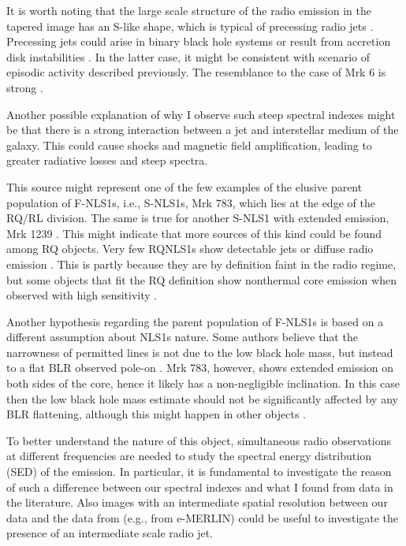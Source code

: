 \documentclass[../thesis.tex]{subfiles}
\begin{document}
It is worth noting that the large scale structure of the radio emission in the tapered image has an S-like shape, which is typical of precessing radio jets \citep{Ekers78,Parma85}.
Precessing jets could arise in binary black hole systems \citep[e.g.,][]{Roos93,Romero00,Rubinur17} or result from accretion disk instabilities \citep{Pringle96,Livio97}.
In the latter case, it might be consistent with scenario of episodic activity described previously. 
The resemblance to the case of Mrk 6 is strong \citep{Kharb06}.  

Another possible explanation of why I observe such steep spectral indexes might be that there is a strong interaction between a jet and interstellar medium of the galaxy.
This could cause shocks and magnetic field amplification, leading to greater radiative losses and steep spectra.

This source might represent one of the few examples of the elusive parent population of F-NLS1s, i.e., S-NLS1s, 
Mrk 783, which lies at the edge of the RQ/RL division.
The same is true for another S-NLS1 with extended emission, Mrk 1239 \citep{Doi15}.
This might indicate that more sources of this kind could be found among RQ objects. 
Very few RQNLS1s show detectable jets or diffuse radio emission \citep{Berton16b}.
This is partly because they are by definition faint in the radio regime, but some objects that fit the RQ definition show nonthermal core emission when observed with high sensitivity \citep{Giroletti09}.

Another hypothesis regarding the parent population of F-NLS1s is based on a different assumption about NLS1s nature. 
Some authors believe that the narrowness of permitted lines is not due to the low black hole mass, but instead to a flat BLR observed pole-on \citep[e.g.,][]{Decarli08}. 
Mrk 783, however, shows extended emission on both sides of the core, hence it likely has a non-negligible inclination. 
In this case then the low black hole mass estimate should not be significantly affected by any BLR flattening, although this might happen in other objects \citep{Shen14}. 

To better understand the nature of this object, simultaneous radio observations at different frequencies are needed to study the spectral energy distribution (SED) of the emission.
In particular, it is fundamental to investigate the reason of such a difference between our spectral indexes and what I found from data in the literature.
Also images with an intermediate spatial resolution between our data and the data from \citet{Doi13} (e.g., from e-MERLIN) could be useful to investigate the presence of an intermediate scale radio jet.
\end{document}
